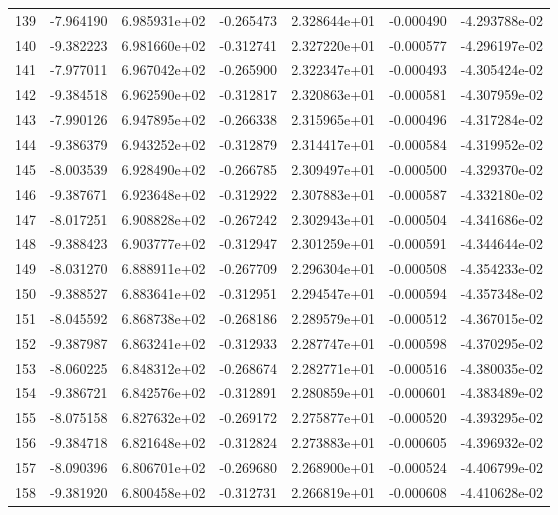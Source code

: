 \begin{tabular}{rrrrrrr}
 139 &  -7.964190 &  6.985931e+02 & -0.265473 &  2.328644e+01 &   -0.000490 & -4.293788e-02 \\
 140 &  -9.382223 &  6.981660e+02 & -0.312741 &  2.327220e+01 &   -0.000577 & -4.296197e-02 \\
 141 &  -7.977011 &  6.967042e+02 & -0.265900 &  2.322347e+01 &   -0.000493 & -4.305424e-02 \\
 142 &  -9.384518 &  6.962590e+02 & -0.312817 &  2.320863e+01 &   -0.000581 & -4.307959e-02 \\
 143 &  -7.990126 &  6.947895e+02 & -0.266338 &  2.315965e+01 &   -0.000496 & -4.317284e-02 \\
 144 &  -9.386379 &  6.943252e+02 & -0.312879 &  2.314417e+01 &   -0.000584 & -4.319952e-02 \\
 145 &  -8.003539 &  6.928490e+02 & -0.266785 &  2.309497e+01 &   -0.000500 & -4.329370e-02 \\
 146 &  -9.387671 &  6.923648e+02 & -0.312922 &  2.307883e+01 &   -0.000587 & -4.332180e-02 \\
 147 &  -8.017251 &  6.908828e+02 & -0.267242 &  2.302943e+01 &   -0.000504 & -4.341686e-02 \\
 148 &  -9.388423 &  6.903777e+02 & -0.312947 &  2.301259e+01 &   -0.000591 & -4.344644e-02 \\
 149 &  -8.031270 &  6.888911e+02 & -0.267709 &  2.296304e+01 &   -0.000508 & -4.354233e-02 \\
 150 &  -9.388527 &  6.883641e+02 & -0.312951 &  2.294547e+01 &   -0.000594 & -4.357348e-02 \\
 151 &  -8.045592 &  6.868738e+02 & -0.268186 &  2.289579e+01 &   -0.000512 & -4.367015e-02 \\
 152 &  -9.387987 &  6.863241e+02 & -0.312933 &  2.287747e+01 &   -0.000598 & -4.370295e-02 \\
 153 &  -8.060225 &  6.848312e+02 & -0.268674 &  2.282771e+01 &   -0.000516 & -4.380035e-02 \\
 154 &  -9.386721 &  6.842576e+02 & -0.312891 &  2.280859e+01 &   -0.000601 & -4.383489e-02 \\
 155 &  -8.075158 &  6.827632e+02 & -0.269172 &  2.275877e+01 &   -0.000520 & -4.393295e-02 \\
 156 &  -9.384718 &  6.821648e+02 & -0.312824 &  2.273883e+01 &   -0.000605 & -4.396932e-02 \\
 157 &  -8.090396 &  6.806701e+02 & -0.269680 &  2.268900e+01 &   -0.000524 & -4.406799e-02 \\
 158 &  -9.381920 &  6.800458e+02 & -0.312731 &  2.266819e+01 &   -0.000608 & -4.410628e-02 \\

\end{tabular}
